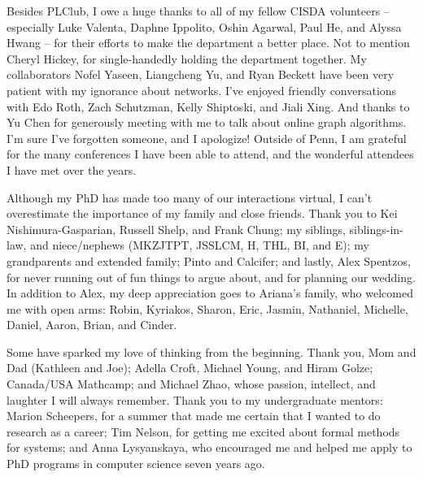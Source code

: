 Besides PLClub, I owe a huge thanks to all of my fellow CISDA volunteers -- especially Luke Valenta, Daphne Ippolito, Oshin Agarwal, Paul He, and Alyssa Hwang -- for their efforts to make the department a better place.
Not to mention Cheryl Hickey, for single-handedly holding the department together.
My collaborators Nofel Yaseen, Liangcheng Yu, and Ryan Beckett have been very patient with my ignorance about networks.
I've enjoyed friendly conversations with Edo Roth, Zach Schutzman, Kelly Shiptoski, and Jiali Xing.
And thanks to Yu Chen for generously meeting with me to talk about online graph algorithms.
I'm sure I've forgotten someone, and I apologize!
Outside of Penn, I am grateful for the many conferences I have been able to attend, and the wonderful attendees I have met over the years.

Although my PhD has made too many of our interactions virtual, I can't overestimate the importance of my family and close friends.
Thank you to Kei Nishimura-Gasparian, Russell Shelp, and Frank Chung; my siblings, siblings-in-law, and niece/nephews (MKZJTPT, JSSLCM, H, THL, BI, and E); my grandparents and extended family; Pinto and Calcifer;
and lastly, Alex Spentzos, for never running out of fun things to argue about, and for planning our wedding. In addition to Alex, my deep appreciation goes to Ariana's family, who welcomed me with open arms: Robin, Kyriakos, Sharon, Eric, Jasmin, Nathaniel, Michelle, Daniel, Aaron, Brian, and Cinder.

Some have sparked my love of thinking from the beginning.
Thank you, Mom and Dad (Kathleen and Joe);
Adella Croft, Michael Young, and Hiram Golze;
Canada/USA Mathcamp;
and Michael Zhao,
whose passion, intellect, and laughter I will always remember.
Thank you to my undergraduate mentors: Marion Scheepers, for a summer that made me certain that I wanted to do research as a career;
Tim Nelson, for getting me excited about formal methods for systems;
and Anna Lysyanskaya, who encouraged me and helped me apply to PhD programs in computer science seven years ago.
